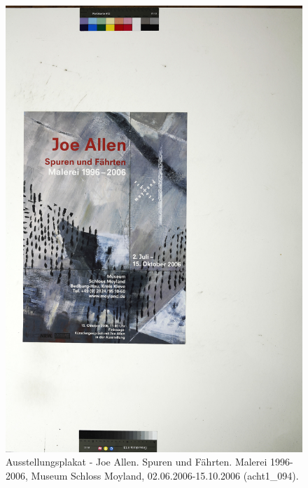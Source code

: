 \documentclass[a4paper,12pt,ngerman]{article}
\begin{document}
\newpage
\begin{figure}[ht]
\includegraphics[width=\linewidth]{Abbildung_45_(acht1_094)}
\centering
\caption{Ausstellungsplakat - Joe Allen. Spuren und Fährten. Malerei 1996-2006, Museum Schloss Moyland, 02.06.2006-15.10.2006 (acht1\_094).}
\end{figure}
\end{document}

